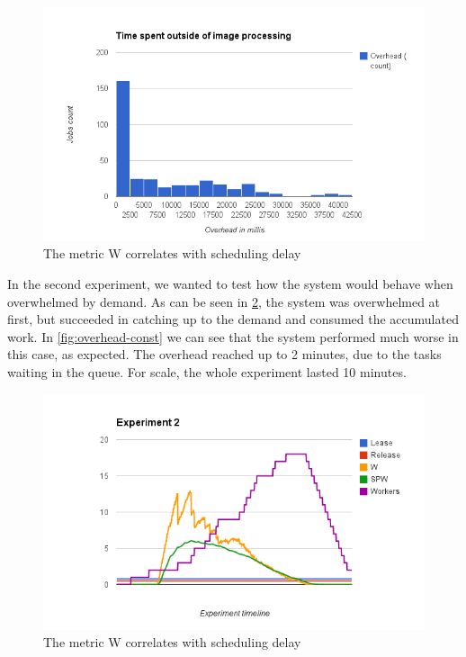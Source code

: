 \documentclass{stylesheet}
\begin{document}
\begin{figure}[b!]
	\centering
	\includegraphics[width=\linewidth]{overhead-exp2.png}
	\caption{The metric W correlates with scheduling delay}
	\label{fig:overhead-exp2}
\end{figure}

In the second experiment, we wanted to test how the system would behave when overwhelmed by demand. As can be seen in \cref{fig:const-timeline}, the system was overwhelmed at first, but succeeded in catching up to the demand and consumed the accumulated work. In \cref{fig:overhead-const} we can see that the system performed much worse in this case, as expected. The overhead reached up to 2 minutes, due to the tasks waiting in the queue. For scale, the whole experiment lasted 10 minutes. 

\begin{figure}[b!]
	\centering
	\includegraphics[width=\linewidth]{const-timeline.png}
	\caption{The metric W correlates with scheduling delay}
	\label{fig:const-timeline}
\end{figure}
\end{document}
